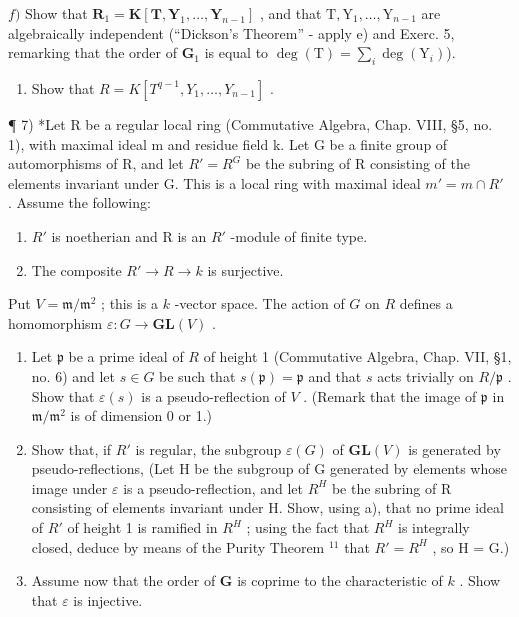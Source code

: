 \(f)\) Show that \(\mathbf{R}_1 = \mathbf{K}[\mathbf{T},\mathbf{Y}_1,\dots ,\mathbf{Y}_{n - 1}]\) , and that \(\mathrm{T},\mathrm{Y}_1,\dots ,\mathrm{Y}_{n - 1}\) are algebraically independent (``Dickson's Theorem'' - apply e) and Exerc. 5, remarking that the order of \(\mathbf{G}_1\) is equal to \(\deg (\mathrm{T}) = \sum_{i}\deg (\mathrm{Y}_i)\)).

\begin{enumerate}
\def\labelenumi{\alph{enumi})}
\setcounter{enumi}{6}
\tightlist
\item
  Show that \(R = K[T^{q-1}, Y_{1}, \ldots, Y_{n-1}]\) .
\end{enumerate}

¶ 7) *Let R be a regular local ring (Commutative Algebra, Chap. VIII, §5, no. 1), with maximal ideal m and residue field k. Let G be a finite group of automorphisms of R, and let \(R' = R^{G}\) be the subring of R consisting of the elements invariant under G. This is a local ring with maximal ideal \(m' = m \cap R'\) . Assume the following:

\begin{enumerate}
\def\labelenumi{(\roman{enumi})}
\item
  \(R'\) is noetherian and R is an \(R'\) -module of finite type.
\item
  The composite \(R'\to R\to k\) is surjective.
\end{enumerate}

Put \(V = \mathfrak{m} / \mathfrak{m}^2\) ; this is a \(k\) -vector space. The action of \(G\) on \(R\) defines a homomorphism \(\varepsilon : G \to \mathbf{GL}(V)\) .

\begin{enumerate}
\def\labelenumi{\alph{enumi})}
\item
  Let \(\mathfrak{p}\) be a prime ideal of \(R\) of height 1 (Commutative Algebra, Chap. VII, §1, no. 6) and let \(s \in G\) be such that \(s(\mathfrak{p}) = \mathfrak{p}\) and that \(s\) acts trivially on \(R / \mathfrak{p}\) . Show that \(\varepsilon(s)\) is a pseudo-reflection of \(V\) . (Remark that the image of \(\mathfrak{p}\) in \(\mathfrak{m} / \mathfrak{m}^2\) is of dimension 0 or 1.)
\item
  Show that, if \(R'\) is regular, the subgroup \(\varepsilon(G)\) of \(\mathbf{GL}(V)\) is generated by pseudo-reflections, (Let H be the subgroup of G generated by elements whose image under \(\varepsilon\) is a pseudo-reflection, and let \(R^{H}\) be the subring of R consisting of elements invariant under H. Show, using a), that no prime ideal of \(R'\) of height 1 is ramified in \(R^{H}\) ; using the fact that \(R^{H}\) is integrally closed, deduce by means of the Purity Theorem \(^{11}\) that \(R' = R^{H}\) , so H = G.)
\item
  Assume now that the order of \(\mathbf{G}\) is coprime to the characteristic of \(k\) . Show that \(\varepsilon\) is injective.
\end{enumerate}

